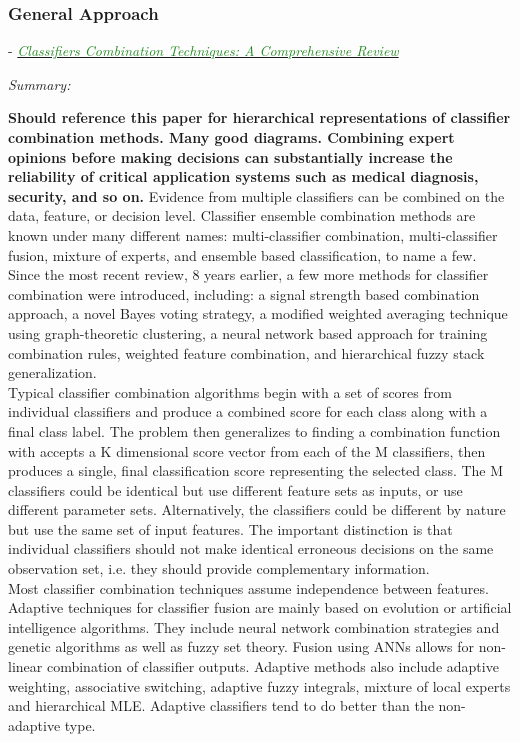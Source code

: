 \documentclass[]{article}
\newcommand{\paperentry}[4]{
            \hangindent=1cm
            \cite{#1} - \href{run:../References/#3}{\textcolor{ForestGreen}{\textit{#2}}}
            
            \noindent            
            \begin{minipage}[t]{0.1\linewidth}\hfill\end{minipage}
            \begin{minipage}[t]{0.8\linewidth}\textcolor{NavyBlue}{{\textit{Summary:}}}#4\end{minipage}
            \vspace{.25cm}
          }
\begin{document}
		\subsubsection{General Approach}
			\paperentry{Mohandes2018ClassifierCombinationTechniquesReview}
			{Classifiers Combination Techniques: A Comprehensive Review}
			{Fusion/Reviews/Mohandes2018ClassifierCombinationTechniquesReview.pdf}
			{} \newline
			\textbf{Should reference this paper for hierarchical representations of classifier combination methods.  Many good diagrams.  Combining expert opinions before making decisions can substantially increase the reliability of critical application systems such as medical diagnosis, security, and so on.}  Evidence from multiple classifiers can be combined on the data, feature, or decision level.  Classifier ensemble combination methods are known under many different names: multi-classifier combination, multi-classifier fusion, mixture of experts, and ensemble based classification, to name a few.  Since the most recent review, 8 years earlier, a few more methods for classifier combination were introduced, including: a signal strength based combination approach, a novel Bayes voting strategy, a modified weighted averaging technique using graph-theoretic clustering, a neural network based approach for training combination rules, weighted feature  combination, and hierarchical fuzzy stack generalization. \\
			\noindent
			Typical classifier combination algorithms begin with a set of scores from individual classifiers and produce a combined score for each class along with a final class label.  The problem then generalizes to finding a combination function with accepts a K dimensional score vector from each of the M classifiers, then produces a single, final classification score representing the selected class.  The M classifiers could be identical but use different feature sets as inputs, or use different parameter sets.  Alternatively, the classifiers could be different by nature but use the same set of input features.  The important distinction is that individual classifiers should not make identical erroneous decisions on the same observation set, i.e. they should provide complementary information. \\
			\noindent
			Most classifier combination techniques assume independence between features. \\
			\noindent Adaptive techniques for classifier fusion are mainly based on evolution or artificial intelligence algorithms.  They include neural network combination strategies and genetic algorithms as well as fuzzy set theory. Fusion using ANNs allows for non-linear combination of classifier outputs.  Adaptive methods also include adaptive weighting, associative switching, adaptive fuzzy integrals, mixture of local experts and hierarchical MLE.  Adaptive classifiers tend to do better than the non-adaptive type.  \\ 
\end{document}
